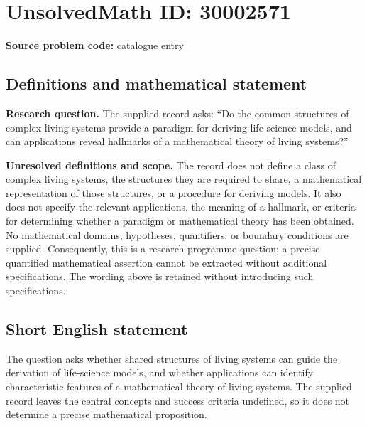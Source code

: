 \documentclass[11pt]{article}
\begin{document}
\section*{UnsolvedMath ID: 30002571}
\textbf{Source problem code:} catalogue entry
\subsection{Definitions and mathematical statement}
\textbf{Research question.} The supplied record asks: ``Do the common structures of complex living systems provide a paradigm for deriving life-science models, and can applications reveal hallmarks of a mathematical theory of living systems?''

\textbf{Unresolved definitions and scope.} The record does not define a class of complex living systems, the structures they are required to share, a mathematical representation of those structures, or a procedure for deriving models. It also does not specify the relevant applications, the meaning of a hallmark, or criteria for determining whether a paradigm or mathematical theory has been obtained. No mathematical domains, hypotheses, quantifiers, or boundary conditions are supplied. Consequently, this is a research-programme question; a precise quantified mathematical assertion cannot be extracted without additional specifications. The wording above is retained without introducing such specifications.
\subsection{Short English statement}
The question asks whether shared structures of living systems can guide the derivation of life-science models, and whether applications can identify characteristic features of a mathematical theory of living systems. The supplied record leaves the central concepts and success criteria undefined, so it does not determine a precise mathematical proposition.
\end{document}
